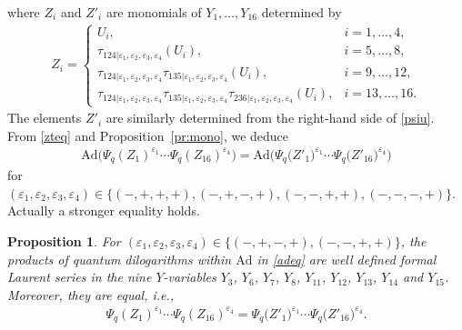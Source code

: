 \documentclass[11pt]{article}
\numberwithin{equation}{section}
\numberwithin{equation}{section}
\newtheorem{Proposition}[Theorem]{Proposition}
 { \theoremstyle{definition}
\newtheorem{Example}[Theorem]{Example}
\newtheorem{Remark}[Theorem]{Remark} }
\begin{document}
where $Z_i$ and $Z'_i$ are monomials of $Y_1, \dots, Y_{16}$
determined by
\begin{align}\label{zu}
Z_i = \begin{cases} U_i, & i = 1,\dotsc, 4,
\\
 \tau_{124|\varepsilon_1,\varepsilon_2,\varepsilon_3,\varepsilon_4}
 (U_i), & i=5,\dotsc, 8,
\\
\tau_{124|\varepsilon_1,\varepsilon_2,\varepsilon_3,\varepsilon_4}
\tau_{135|\varepsilon_1,\varepsilon_2,\varepsilon_3,\varepsilon_4}
(U_i), & i=9, \ldots, 12,
\\
\tau_{124|\varepsilon_1,\varepsilon_2,\varepsilon_3,\varepsilon_4}
\tau_{135|\varepsilon_1,\varepsilon_2,\varepsilon_3,\varepsilon_4}
\tau_{236|\varepsilon_1,\varepsilon_2,\varepsilon_3,\varepsilon_4}
(U_i), & i=13, \ldots, 16.
\end{cases}
\end{align}
The elements $Z'_i$ are similarly determined from the
right-hand side of \eqref{psiu}.
%
From \eqref{zteq} and Proposition~\ref{pr:mono}, we deduce
\begin{align}\label{adeq}
\mathrm{Ad}\bigl(\Psi_q(Z_1)^{\varepsilon_1}\cdots \Psi_q(Z_{16})^{\varepsilon_{4}}\bigr)
=\mathrm{Ad}\bigl(\Psi_q\bigl(Z'_1\bigr)^{\varepsilon_1}\cdots \Psi_q\bigl(Z'_{16}\bigr)^{\varepsilon_{4}}\bigr)
\end{align}
for $(\varepsilon_1,\varepsilon_2,\varepsilon_3,\varepsilon_4) \in
\{(-,+,+,+), (-,+,-,+), (-,-,+,+), (-,-,-,+)\}$.
Actually a stronger equality holds.

\begin{Proposition}\label{pr:dilog}
For $(\varepsilon_1,\varepsilon_2,\varepsilon_3,\varepsilon_4) \in \{(-,+,-,+), (-,-,+,+)\}$,
the products of quantum dilogarithms within $\mathrm{Ad}$ in \eqref{adeq}
are well defined formal Laurent series in
the nine $Y$-variables
$Y_3$, $Y_6$, $Y_7$, $Y_8$, $Y_{11}$, $Y_{12}$, $Y_{13}$, $Y_{14}$ and $Y_{15}$.
Moreover, they are equal, i.e.,
\begin{align}\label{pseq}
\Psi_q(Z_1)^{\varepsilon_1}\dotsm \Psi_q(Z_{16})^{\varepsilon_{4}}
=
\Psi_q\bigl(Z'_1\bigr)^{\varepsilon_1}\dotsm \Psi_q\bigl(Z'_{16}\bigr)^{\varepsilon_{4}}.
\end{align}
\end{Proposition}
\end{document}

